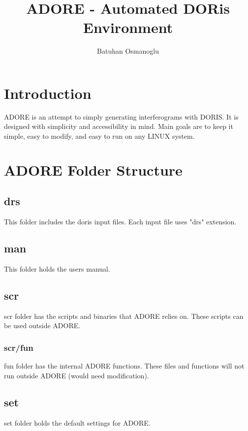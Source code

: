 \documentclass[letterpaper,10pt]{article}
\title{ADORE - Automated DORis Environment}
\author{Batuhan Osmanoglu}
\begin{document}
\maketitle

\begin{abstract}

\end{abstract}

\section{Introduction}
ADORE is an attempt to simply generating interferograms with DORIS. It is designed with simplicity and accessibility in mind. Main goals are to keep it simple, easy to modify, and easy to run on any LINUX system. 

\section{ADORE Folder Structure}
\subsection{drs}
This folder includes the doris input files. Each input file uses "drs" extension. 
\subsection{man}
This folder holds the users manual.
\subsection{scr}
scr folder has the scripts and binaries that ADORE relies on. These scripts can be used outside ADORE.
\subsubsection*{scr/fun}
fun folder has the internal ADORE functions. These files and functions will not run outside ADORE (would need modification).
\subsection{set}
set folder holds the default settings for ADORE. 
\end{document}
